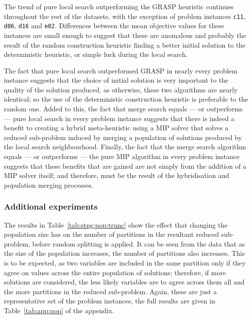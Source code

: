 \documentclass[preprint]{elsarticle}
\begin{document}
The trend of pure local search outperforming the GRASP heuristic continues throughout the rest of the datasets, with the exception of problem instances \texttt{c11}, \texttt{d06}, \texttt{d16} and \texttt{e02}. Differences between the mean objective values for these instances are small enough to suggest that these are anomalous and probably the result of the random construction heuristic finding a better initial solution to the deterministic heuristic, or simple luck during the local search. 

The fact that pure local search outperformed GRASP in nearly every problem instance suggests that the choice of initial solution is very important to the quality of the solution produced, as otherwise, these two algorithms are nearly identical; so the use of the deterministic construction heuristic is preferable to the random one. Added to this, the fact that merge search equals --- or outperforms --- pure local search in every problem instance suggests that there is indeed a benefit to creating a hybrid meta-heuristic using a MIP solver that solves a reduced sub-problem induced by merging a population of solutions produced by the local search neighbourhood. Finally, the fact that the merge search algorithm equals --- or outperforms --- the pure MIP algorithm in every problem instance suggests that these benefits that are gained are not simply from the addition of a MIP solver itself; and therefore, must be the result of the hybridisation and population merging processes.

\subsubsection*{\textbf{Additional experiments}}

The results in Table~\ref{tab:stpg:pop:trunc} show the effect that changing the population size has on the number of partitions in the resultant reduced sub-problem, before random splitting is applied. It can be seen from the data that as the size of the population increases, the number of partitions also increases. This is to be expected, as two variables are included in the same partition only if they agree on values across the entire population of solutions; therefore, if more solutions are considered, the less likely variables are to agree across them all and the more partitions in the reduced sub-problem. Again, these are just a representative set of the problem instances, the full results are given in Table~\ref{tab:app:pop} of the appendix.
\end{document}
